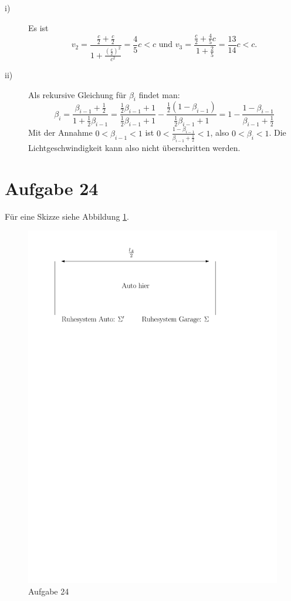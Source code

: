 \begin{description}
	\item[i)] Es ist 
	\[
		v_2 = \frac{\frac{c}{2} + \frac{c}{2}}{1 + \frac{\left(\frac{c}{2}\right)^2}{c^2}} = \frac{4}{5} c < c
		\text{ und } 
		v_3 = \frac{\frac{c}{2} + \frac{4}{5} c}{1 + \frac{2}{5}} = \frac{13}{14} c < c
		\text{.}
	\]
	
	\item[ii)] Als rekursive Gleichung für $\beta_i$ findet man:
	\[
		\beta_i = \frac{\beta_{i - 1} + \frac{1}{2}}{1 + \frac{1}{2} \beta_{i - 1}}
		= \frac{\frac{1}{2} \beta_{i - 1} + 1}{\frac{1}{2} \beta_{i - 1} + 1} - \frac{\frac{1}{2} (1 - \beta_{i - 1})}{\frac{1}{2} \beta_{i - 1} + 1}
		= 1 - \frac{1 - \beta_{i - 1}}{\beta_{i - 1} + \frac{1}{2}}
	\]
	Mit der Annahme $0 < \beta_{i - 1} < 1$ ist $0 < \frac{1 - \beta_{i - 1}}{\beta_{i - 1} + \frac{1}{2}} < 1$, also $0 < \beta_i < 1$. Die Lichtgeschwindigkeit kann also nicht überschritten werden.
\end{description}

\section*{Aufgabe 24}

Für eine Skizze siehe Abbildung \ref{fig:ueb11_aufgabe24}.

\begin{figure}[h]
	\centering
	\includegraphics{figures/ueb11/aufgabe24}
	\caption{Aufgabe 24}
	\label{fig:ueb11_aufgabe24}
\end{figure}

